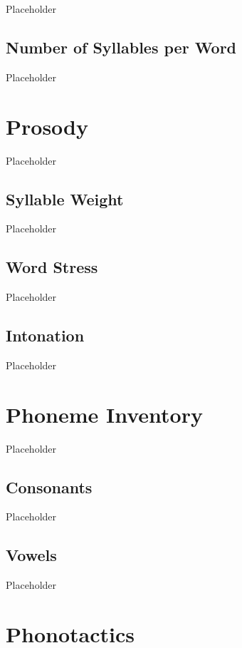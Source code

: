 Placeholder

\subsection{Number of Syllables per Word}
\label{subsec:tvk-num-syll}

Placeholder

\section{\langtvk{} Prosody}
\label{sec:tvk-prosody}

Placeholder

\subsection{Syllable Weight}
\label{subsec:tvk-syll-weight}

Placeholder

\subsection{Word Stress}
\label{subsec:tvk-word-stress}

Placeholder

\subsection{Intonation}
\label{subsec:tvk-intonation}

Placeholder

\section{\langank{} Phoneme Inventory}
\label{sec:ank-phone-inventory}

Placeholder

\subsection{Consonants}
\label{subsec:ank-consonants}

Placeholder

\subsection{Vowels}
\label{subsec:ank-vowels}

Placeholder

\section{\langank{} Phonotactics}
\label{sec:ank-phonotactics}

